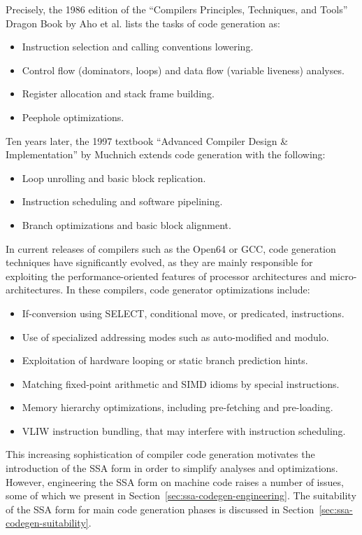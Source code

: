 Precisely, the 1986 edition of
the ``Compilers Principles, Techniques, and Tools'' Dragon Book by Aho et al.
lists the tasks of code generation as:
\begin{itemize}
\item Instruction selection and calling conventions lowering.
\item Control flow (dominators, loops) and data flow (variable liveness) analyses.
\item Register allocation and stack frame building.
\item Peephole optimizations.
\end{itemize}
Ten years later, the 1997 textbook ``Advanced Compiler Design \& Implementation''
by Muchnich extends code generation with the following: \begin{itemize}
\item Loop unrolling and basic block replication.
\item Instruction scheduling and software pipelining.
\item Branch optimizations and basic block alignment.
\end{itemize}
In current releases of compilers such as the Open64 or GCC, code generation
techniques have significantly evolved, as they are mainly responsible for
exploiting the performance-oriented features of processor architectures and
micro-architectures. In these compilers, code generator optimizations
include: \begin{itemize}
\item If-conversion using SELECT, conditional move, or predicated, instructions.
\item Use of specialized addressing modes such as auto-modified and modulo.
\item Exploitation of hardware looping or static branch prediction hints.
\item Matching fixed-point arithmetic and SIMD idioms by special instructions.
\item Memory hierarchy optimizations, including pre-fetching and pre-loading.
\item VLIW instruction bundling, that may interfere with instruction
scheduling.
\end{itemize}

This increasing sophistication of compiler code generation motivates the
introduction of the SSA form in order to simplify analyses and optimizations.
However, engineering the SSA form on machine code raises a number of issues,
some of which we present in Section~\ref{sec:ssa-codegen-engineering}.  The
suitability of the SSA form for main code generation phases is discussed in
Section~\ref{sec:ssa-codegen-suitability}.

